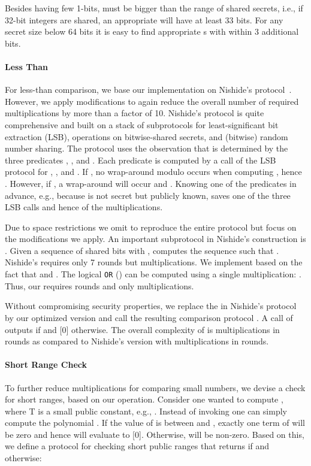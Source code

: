 \documentclass[letterpaper,11pt,onecolumn,titlepage]{article}
\begin{document}
Besides having few 1-bits,  must be bigger than the range of shared secrets, i.e., if 32-bit integers are shared, an appropriate  will have at least 33 bits. For any secret size below 64 bits it is easy to find appropriate s with  within 3 additional bits.

\paragraph{Less Than}



For less-than comparison, we base our implementation on Nishide's protocol~\cite{nishide2007nobitdecomp}. However, we apply modifications to again reduce the overall number of required multiplications by more than a factor of 10. Nishide's protocol is quite comprehensive and built on a stack of subprotocols for 
least-significant bit extraction (LSB), operations on bitwise-shared secrets, and (bitwise) random number sharing. The protocol uses the observation that  is determined by the three predicates , , and . Each predicate is computed by a call of the LSB protocol for , , and . If , no wrap-around modulo  occurs when computing , hence . However, if , a wrap-around will occur and .
Knowing one of the predicates in advance, e.g., because  is not secret but publicly known, saves one of the three LSB calls and hence  of the multiplications. 

Due to space restrictions we omit to reproduce the entire protocol but focus on the modifications we apply. An important subprotocol in Nishide's construction is . Given a sequence of shared bits  with ,  computes the sequence  such that . Nishide's  requires only 7 rounds but  multiplications. We implement  based on the fact that  and . The logical \texttt{OR} () can be computed using a single multiplication: . Thus, our  requires  rounds and only  multiplications. 

Without compromising security properties, we replace the  in Nishide's protocol by our optimized version and call the resulting comparison protocol . A call of  outputs  if  and [0] otherwise. The overall complexity of  is  multiplications in  rounds as compared to Nishide's version with  multiplications in  rounds. 

\paragraph{Short Range Check}
To further reduce multiplications for comparing small numbers, we devise a check for short ranges, based on our  operation.
Consider one wanted to compute , where T is a small public constant, e.g., . Instead of invoking  one can simply compute the polynomial
. If the value of  is between  and , exactly one term of  will be zero and hence 
will evaluate to [0]. Otherwise,  will be non-zero. Based on this, we define a protocol for checking short public ranges that returns  if  and  otherwise:
\end{document}

